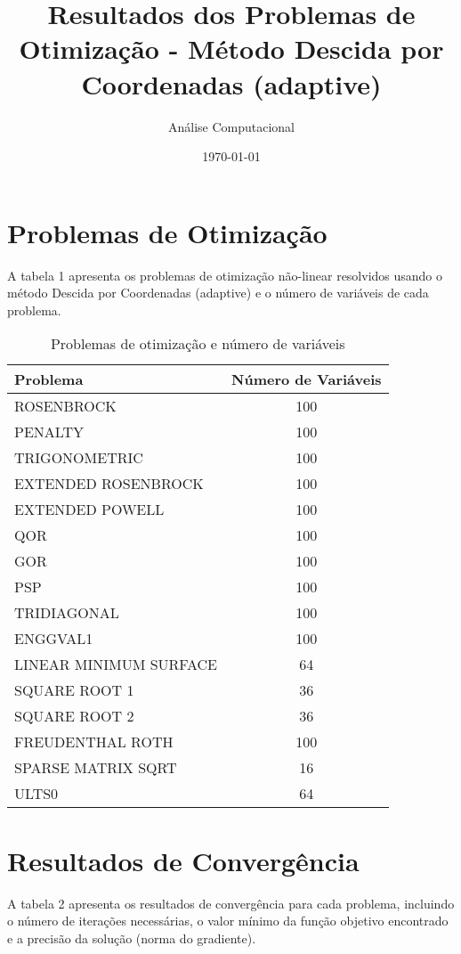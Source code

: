 \documentclass[12pt]{article}
\title{Resultados dos Problemas de Otimização - Método Descida por Coordenadas (adaptive)}
\author{Análise Computacional}
\date{\today}
\begin{document}
\maketitle

\section{Problemas de Otimização}

A tabela 1 apresenta os problemas de otimização não-linear resolvidos usando o método Descida por Coordenadas (adaptive) e o número de variáveis de cada problema.

\begin{table}[h!]
\centering
\caption{Problemas de otimização e número de variáveis}
\label{tab:problemas_variáveis}
\begin{tabular}{@{}|lc|@{}}
\toprule
\textbf{Problema} & \textbf{Número de Variáveis} \\
\midrule
ROSENBROCK & 100 \\
PENALTY & 100 \\
TRIGONOMETRIC & 100 \\
EXTENDED ROSENBROCK & 100 \\
EXTENDED POWELL & 100 \\
QOR & 100 \\
GOR & 100 \\
PSP & 100 \\
TRIDIAGONAL & 100 \\
ENGGVAL1 & 100 \\
LINEAR MINIMUM SURFACE & 64 \\
SQUARE ROOT 1 & 36 \\
SQUARE ROOT 2 & 36 \\
FREUDENTHAL ROTH & 100 \\
SPARSE MATRIX SQRT & 16 \\
ULTS0 & 64 \\
\bottomrule
\end{tabular}
\end{table}

\section{Resultados de Convergência}

A tabela 2 apresenta os resultados de convergência para cada problema, incluindo o número de iterações necessárias, o valor mínimo da função objetivo encontrado e a precisão da solução (norma do gradiente).
\end{document}
